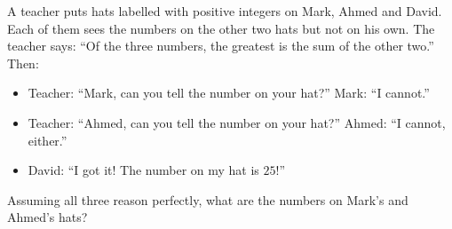 A teacher puts hats labelled with positive integers on Mark, Ahmed and David. Each of them sees the numbers on the other two hats but not on his own. The teacher says: ``Of the three numbers, the greatest is the sum of the other two.'' Then:
\begin{itemize}
\item Teacher: ``Mark, can you tell the number on your hat?'' Mark: ``I cannot.''
\item Teacher: ``Ahmed, can you tell the number on your hat?'' Ahmed: ``I cannot, either.''
\item David: ``I got it! The number on my hat is $25$!''
\end{itemize}
Assuming all three reason perfectly, what are the numbers on Mark's and Ahmed's hats?
